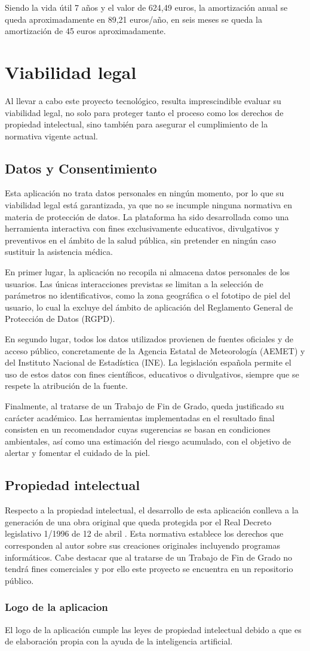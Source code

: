 Siendo la vida útil 7 años y el valor de 624,49 euros, la amortización anual se queda aproximadamente en 89,21 euros/año, en seis meses se queda la amortización de 45 euros aproximadamente.


\section{Viabilidad legal}
Al llevar a cabo este proyecto tecnológico, resulta imprescindible evaluar su viabilidad legal, no solo para proteger tanto el proceso como los derechos de propiedad intelectual, sino también para asegurar el cumplimiento de la normativa vigente actual.


\subsection{Datos y Consentimiento}

Esta aplicación no trata datos personales en ningún momento, por lo que su viabilidad legal está garantizada, ya que no se incumple ninguna normativa en materia de protección de datos. La plataforma ha sido desarrollada como una herramienta interactiva con fines exclusivamente educativos, divulgativos y preventivos en el ámbito de la salud pública, sin pretender en ningún caso sustituir la asistencia médica.

En primer lugar, la aplicación no recopila ni almacena datos personales de los usuarios. Las únicas interacciones previstas se limitan a la selección de parámetros no identificativos, como la zona geográfica o el fototipo de piel del usuario, lo cual la excluye del ámbito de aplicación del Reglamento General de Protección de Datos (RGPD).

En segundo lugar, todos los datos utilizados provienen de fuentes oficiales y de acceso público, concretamente de la Agencia Estatal de Meteorología (AEMET) y del Instituto Nacional de Estadística (INE). La legislación española permite el uso de estos datos con fines científicos, educativos o divulgativos, siempre que se respete la atribución de la fuente.

Finalmente, al tratarse de un Trabajo de Fin de Grado, queda justificado su carácter académico. Las herramientas implementadas en el resultado final consisten en un recomendador cuyas sugerencias se basan en condiciones ambientales, así como una estimación del riesgo acumulado, con el objetivo de alertar y fomentar el cuidado de la piel.

\subsection{Propiedad intelectual}
Respecto a la propiedad intelectual, el desarrollo de esta aplicación conlleva a la generación de una obra original que queda protegida por el Real Decreto legislativo 1/1996 de 12 de abril \cite{BOEA19968930RealDecreto}. Esta normativa establece los derechos que corresponden al autor sobre sus creaciones originales incluyendo programas informáticos.
Cabe destacar que al tratarse de un Trabajo de Fin de Grado no tendrá fines comerciales y por ello este proyecto se encuentra en un repositorio público.

\subsubsection{Logo de la aplicacion}
El logo de la aplicación cumple las leyes de propiedad intelectual debido a que es de elaboración propia con la ayuda de la inteligencia artificial. 